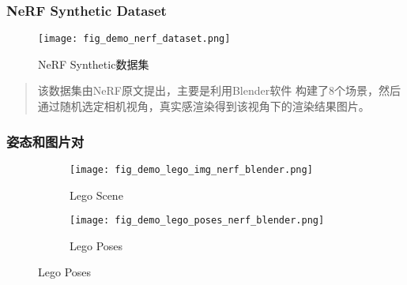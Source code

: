 \begin{frame}
\frametitle{NeRF Synthetic Dataset}
\begin{figure}[H]
    \texttt{[image: fig\_demo\_nerf\_dataset.png]}
    \caption[short]{NeRF Synthetic数据集}
\end{figure}
\begin{quote}
    该数据集由NeRF原文提出，主要是利用Blender软件
    构建了8个场景，然后通过随机选定相机视角，真实感渲染得到该视角下的渲染结果图片。
\end{quote}
\end{frame}

\begin{frame}
\frametitle{姿态和图片对}
\begin{figure}
    \centering
        \begin{subfigure}{0.48\linewidth}
            \texttt{[image: fig\_demo\_lego\_img\_nerf\_blender.png]}
            \caption{Lego Scene}
        \end{subfigure}
        \begin{subfigure}{0.48\linewidth}
            \texttt{[image: fig\_demo\_lego\_poses\_nerf\_blender.png]}
            \caption{Lego Poses}
        \end{subfigure}
\end{figure}
\end{frame}